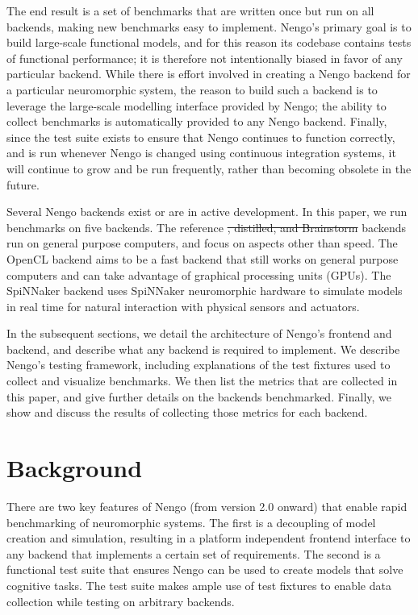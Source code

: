 \documentclass{frontiersSCNS}
\providecommand{\DIFadd}[1]{{\protect\color{blue}\uwave{#1}}} %
\providecommand{\DIFdel}[1]{{\protect\color{red}\sout{#1}}}                      %
\providecommand{\DIFaddbegin}{} %
\providecommand{\DIFaddend}{} %
\providecommand{\DIFdelbegin}{} %
\providecommand{\DIFdelend}{} %
\begin{document}
The end result is a set of benchmarks that
are written once but run on all backends,
making new benchmarks easy to implement.
Nengo's primary goal is to
build large-scale functional models,
and for this reason its codebase contains
tests of functional performance;
it is therefore not intentionally
biased in favor of any particular backend.
While there is effort involved in creating
a Nengo backend for a particular neuromorphic system,
the reason to build such a backend
is to leverage the large-scale modelling interface
provided by Nengo;
the ability to collect benchmarks
is automatically provided to any Nengo backend.
Finally, since the test suite exists
to ensure that Nengo continues to function
correctly, and is run whenever Nengo is changed using
continuous integration systems,
it will continue to grow and be run frequently,
rather than becoming obsolete in the future.

Several Nengo backends exist or are in active development.
In this paper, we run benchmarks
on five backends.
The reference \DIFdelbegin \DIFdel{, distilled, and Brainstorm }\DIFdelend \DIFaddbegin \DIFadd{and distilled }\DIFaddend backends
run on general purpose computers,
and focus on aspects other than speed.
The OpenCL backend aims to be a fast backend
that still works on general purpose computers
and can take advantage of
graphical processing units (GPUs).
The SpiNNaker backend uses
SpiNNaker neuromorphic hardware to
simulate models in real time
for natural interaction with
physical sensors and actuators.

In the subsequent sections,
we detail the architecture of Nengo's
frontend and backend,
and describe what any backend
is required to implement.
We describe Nengo's testing framework,
including explanations of the test fixtures
used to collect and visualize benchmarks.
We then list the metrics
that are collected in this paper,
and give further details on the backends benchmarked.
Finally, we show and discuss
the results of collecting those metrics
for each backend.

\section{Background}

There are two key features of Nengo
(from version 2.0 onward)
that enable rapid benchmarking of neuromorphic systems.
The first is a decoupling of model creation and simulation,
resulting in a platform independent frontend interface
to any backend that implements a certain set of requirements.
The second is a functional test suite that ensures
Nengo can be used to create models that solve cognitive tasks.
The test suite makes ample use of test fixtures
to enable data collection while testing on arbitrary backends.
\end{document}
